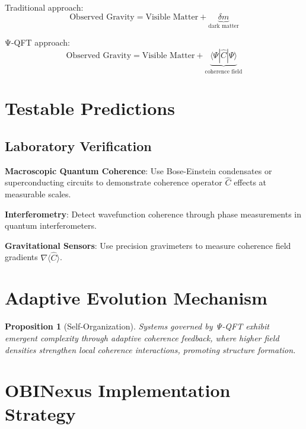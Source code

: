\documentclass{article}
\newtheorem{proposition}{Proposition}[section]
\begin{document}
\begin{tcolorbox}[colback=blue!5!white,colframe=blue!75!black,title=Coherence Operator]
\begin{tcolorbox}[title={Executive Summary - OBINexus Framework},obinexus]
\begin{tcolorbox}[title={Core Premise (Technical)},theory]
Traditional approach:
\begin{equation}
\text{Observed Gravity} = \text{Visible Matter} + \underbrace{\delta m}_{\text{dark matter}}
\end{equation}

Ψ-QFT approach:
\begin{equation}
\text{Observed Gravity} = \text{Visible Matter} + \underbrace{\langle\Psi|\hat{C}|\Psi\rangle}_{\text{coherence field}}
\end{equation}

\section{Testable Predictions}



\subsection{Laboratory Verification}

\begin{tcolorbox}[title={Experimental Protocol},math]
\textbf{Macroscopic Quantum Coherence}: Use Bose-Einstein condensates or superconducting circuits to demonstrate coherence operator $\hat{C}$ effects at measurable scales.

\textbf{Interferometry}: Detect wavefunction coherence through phase measurements in quantum interferometers.

\textbf{Gravitational Sensors}: Use precision gravimeters to measure coherence field gradients $\nabla\langle\hat{C}\rangle$.


\section{Adaptive Evolution Mechanism}


\begin{proposition}[Self-Organization]
Systems governed by Ψ-QFT exhibit emergent complexity through adaptive coherence feedback, where higher field densities strengthen local coherence interactions, promoting structure formation.
\end{proposition}

\section{OBINexus Implementation Strategy}


\end{tcolorbox}
\end{tcolorbox}
\end{tcolorbox}
\end{tcolorbox}
\end{document}
